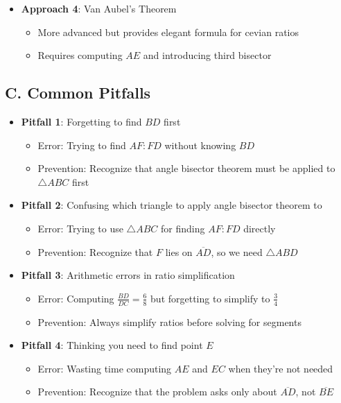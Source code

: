 \documentclass[12pt]{article}
\begin{document}
\begin{roadmapbox}
\begin{itemize}[leftmargin=*]
    \item \textbf{Approach 4}: Van Aubel's Theorem
    \begin{itemize}
        \item More advanced but provides elegant formula for cevian ratios
        \item Requires computing $AE$ and introducing third bisector
    \end{itemize}
\end{itemize}

\subsection*{C. Common Pitfalls}
\begin{itemize}[leftmargin=*]
    \item \textbf{Pitfall 1}: Forgetting to find $BD$ first
    \begin{itemize}
        \item Error: Trying to find $AF:FD$ without knowing $BD$
        \item Prevention: Recognize that angle bisector theorem must be applied to $\triangle ABC$ first
    \end{itemize}
    
    \item \textbf{Pitfall 2}: Confusing which triangle to apply angle bisector theorem to
    \begin{itemize}
        \item Error: Trying to use $\triangle ABC$ for finding $AF:FD$ directly
        \item Prevention: Recognize that $F$ lies on $\overline{AD}$, so we need $\triangle ABD$
    \end{itemize}
    
    \item \textbf{Pitfall 3}: Arithmetic errors in ratio simplification
    \begin{itemize}
        \item Error: Computing $\frac{BD}{DC} = \frac{6}{8}$ but forgetting to simplify to $\frac{3}{4}$
        \item Prevention: Always simplify ratios before solving for segments
    \end{itemize}
    
    \item \textbf{Pitfall 4}: Thinking you need to find point $E$
    \begin{itemize}
        \item Error: Wasting time computing $AE$ and $EC$ when they're not needed
        \item Prevention: Recognize that the problem asks only about $\overline{AD}$, not $\overline{BE}$
    \end{itemize}
    

\end{itemize}
\end{roadmapbox}
\end{document}
